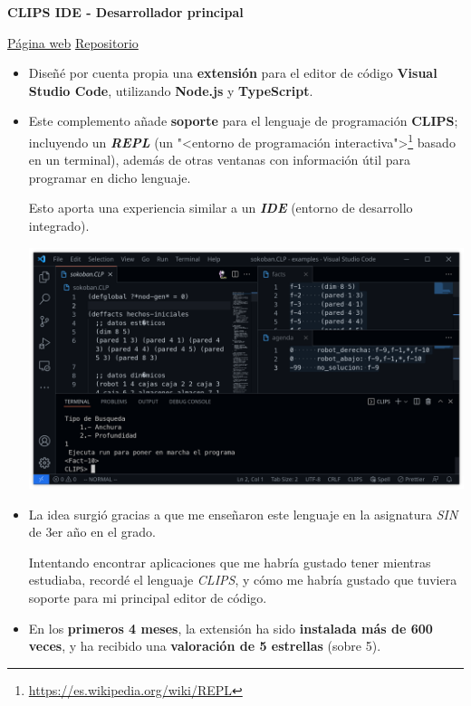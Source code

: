 \documentclass[letterpaper, 12pt, dvipsnames]{article}
\begin{document}
\pagebreak

\begin{center}
    \large{\textbf{CLIPS IDE - Desarrollador principal}}\par
    \vspace{.2em}
    \href{https://marketplace.visualstudio.com/items?itemName=algono.clips-ide}{Página web}
    \hspace{1em}\href{https://github.com/algono/clips-ide-vscode}{Repositorio}
\end{center}
\begin{itemize}
    \item Diseñé por cuenta propia una \textbf{extensión} para el editor de código \textbf{Visual Studio Code}, utilizando \textbf{Node.js} y \textbf{TypeScript}.
    \item Este complemento añade \textbf{soporte} para el lenguaje de programación \textbf{CLIPS}; incluyendo un \textbf{\emph{REPL}} (un "<entorno de programación interactiva">\footnote{\url{https://es.wikipedia.org/wiki/REPL}} basado en un terminal), además de otras ventanas con información útil para programar en dicho lenguaje.

          Esto aporta una experiencia similar a un \textbf{\emph{IDE}} (entorno de desarrollo integrado).

          \includegraphics[width=.9415\textwidth]{vscode-clips-ide.png}

    \item La idea surgió gracias a que me enseñaron este lenguaje en la asignatura \emph{SIN} de 3er año en el grado.

          Intentando encontrar aplicaciones que me habría gustado tener mientras estudiaba, recordé el lenguaje \emph{CLIPS}, y cómo me habría gustado que tuviera soporte para mi principal editor de código.
    \item En los \textbf{primeros 4 meses}, la extensión ha sido \textbf{instalada más de 600 veces}, y ha recibido una \textbf{valoración de 5 estrellas} (sobre 5).
\end{itemize}
\end{document}
